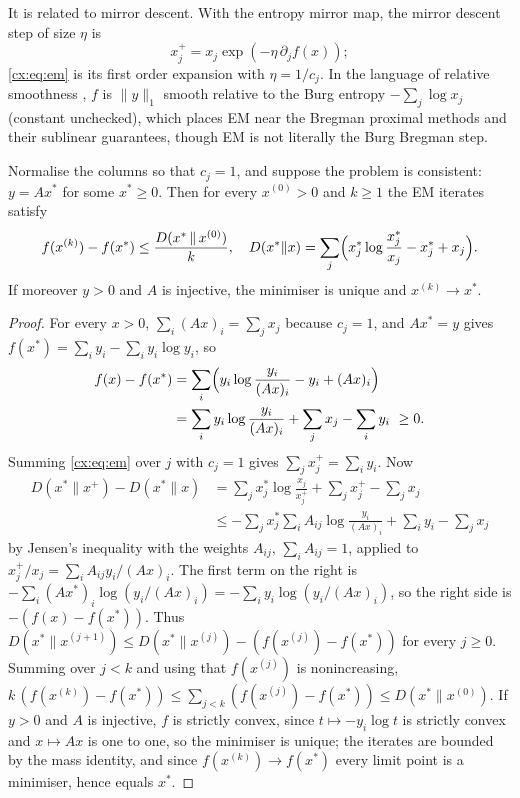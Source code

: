 It is related to mirror descent. With the entropy mirror map, the mirror descent step of size $\eta$ is
\[
x_j^{+}=x_j\exp(-\eta\,\partial_jf(x));
\]
\eqref{cx:eq:em} is its first order expansion with $\eta=1/c_j$. In the language of relative smoothness \cite{BBT17}, $f$ is $\|y\|_1$ smooth relative to the Burg entropy $-\sum_j\log x_j$ (constant unchecked), which places EM near the Bregman proximal methods and their sublinear guarantees, though EM is not literally the Burg Bregman step.

\begin{theorem}\label{cx:thm:emrate}
Normalise the columns so that $c_j=1$, and suppose the problem is consistent: $y=Ax^*$ for some $x^*\ge0$. Then for every $x^{(0)}>0$ and $k\ge1$ the EM iterates satisfy
\[
f(x^{(k)})-f(x^*)\le\frac{D(x^*\,\|\,x^{(0)})}{k},\quad D(x^*\|x)=\sum_j\Bigl(x_j^*\log\frac{x_j^*}{x_j}-x_j^*+x_j\Bigr).
\]
If moreover $y>0$ and $A$ is injective, the minimiser is unique and $x^{(k)}\to x^*$.
\end{theorem}

\begin{proof}
For every $x>0$, $\sum_i(Ax)_i=\sum_jx_j$ because $c_j=1$, and $Ax^*=y$ gives $f(x^*)=\sum_iy_i-\sum_iy_i\log y_i$, so
\[
\begin{split}f(x)-f(x^*)&=\sum_i\Bigl(y_i\log\frac{y_i}{(Ax)_i}-y_i+(Ax)_i\Bigr)\\&=\sum_iy_i\log\frac{y_i}{(Ax)_i}+\sum_jx_j-\sum_iy_i\ \ge0 .\end{split}
\]
Summing \eqref{cx:eq:em} over $j$ with $c_j=1$ gives $\sum_jx_j^+=\sum_iy_i$. Now
\begin{align*}
D(x^*\|x^+)-D(x^*\|x)&=\sum_jx_j^*\log\frac{x_j}{x_j^+}+\sum_jx_j^+-\sum_jx_j\\
&\le-\sum_jx_j^*\sum_iA_{ij}\log\frac{y_i}{(Ax)_i}+\sum_iy_i-\sum_jx_j
\end{align*}
by Jensen's inequality with the weights $A_{ij}$, $\sum_iA_{ij}=1$, applied to $x_j^+/x_j=\sum_iA_{ij}y_i/(Ax)_i$. The first term on the right is $-\sum_i(Ax^*)_i\log(y_i/(Ax)_i)=-\sum_iy_i\log(y_i/(Ax)_i)$, so the right side is $-(f(x)-f(x^*))$. Thus $D(x^*\|x^{(j+1)})\le D(x^*\|x^{(j)})-(f(x^{(j)})-f(x^*))$ for every $j\ge0$. Summing over $j<k$ and using that $f(x^{(j)})$ is nonincreasing, $k\,(f(x^{(k)})-f(x^*))\le\sum_{j<k}(f(x^{(j)})-f(x^*))\le D(x^*\|x^{(0)})$. If $y>0$ and $A$ is injective, $f$ is strictly convex, since $t\mapsto-y_i\log t$ is strictly convex and $x\mapsto Ax$ is one to one, so the minimiser is unique; the iterates are bounded by the mass identity, and since $f(x^{(k)})\to f(x^*)$ every limit point is a minimiser, hence equals $x^*$.
\end{proof}


